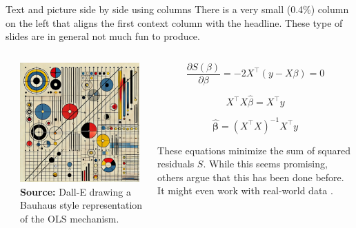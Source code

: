 \documentclass[11pt, aspectratio=169, t]{beamer}
\begin{document}
\begin{frame}{Text and picture side by side using columns}
\label{text-and-picture-side-by-side-using-columns}
There is a very small (0.4\%) column on the left that aligns the first
context column with the headline. These type of slides are in general
not much fun to produce.

\begin{columns}[T]
\begin{column}{0.004\linewidth}
\end{column}

\begin{column}{0.446\linewidth}
\includegraphics[width=\linewidth,height=1.80556in,keepaspectratio]{pictures/OLSpic.png}
\newline \scriptsize\textbf{Source:} Dall-E drawing a Bauhaus style
representation of the OLS mechanism.
\end{column}

\begin{column}{0.55\linewidth}
\normalsize

\begin{equation}
\frac{\partial S(\beta)}{\partial \beta} = -2X^\top (y - X\beta) = 0
\end{equation}

\begin{equation}
X^\top X \hat{\beta} = X^\top y
\end{equation}

\begin{equation}
\hat{\bm{\beta}} = (X^\top X)^{-1} X^\top y
\end{equation}

These equations minimize the sum of squared residuals \(S\). While this
seems promising, others argue that this has been done before. It might
even work with real-world data
\autocites[LancetDH]{stern2022}[REStud]{abadieSemiparametric2005}.
\end{column}
\end{columns}
\end{frame}
\end{document}
